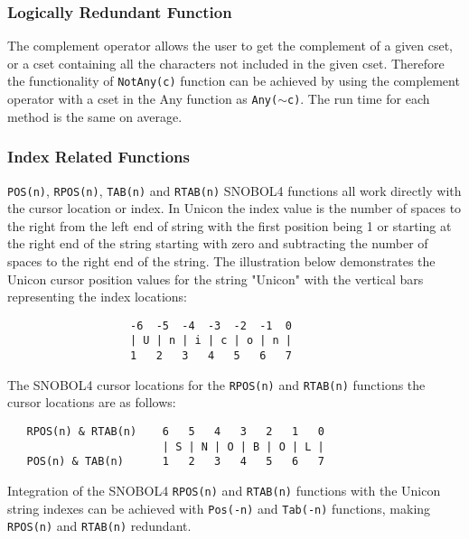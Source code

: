 \documentclass{article}
\begin{document}
\vspace{1 pc}
\subsubsection{Logically Redundant Function}
The complement operator allows the user to get the complement of a given cset, or a cset containing all the characters not included in the given cset.  Therefore the functionality of \texttt{NotAny(c)} function can be achieved by using the complement operator with a cset in the Any function as \texttt{Any($\sim$c)}.  The run time for each method is the same on average.

\vspace{1 pc}
\subsubsection{Index Related Functions}
\texttt{POS(n)}, \texttt{RPOS(n)}, \texttt{TAB(n)} and \texttt{RTAB(n)} SNOBOL4 functions all work directly with the cursor location or index.  In Unicon the index value is the number of spaces to the right from the left end of string with the first position being 1 or starting at the right end of the string starting with zero and subtracting the number of spaces to the right end of the string.\cite{JefferyUnicon}   The illustration below demonstrates the Unicon cursor position values for the string "Unicon" with the vertical bars representing the index locations:

\begin{verbatim}
                   -6  -5  -4  -3  -2  -1  0
                   | U | n | i | c | o | n |
                   1   2   3   4   5   6   7
\end{verbatim}

The SNOBOL4 cursor locations for the \texttt{RPOS(n)} and \texttt{RTAB(n)} functions the cursor locations are as follows:

\begin{verbatim}
   RPOS(n) & RTAB(n)    6   5   4   3   2   1   0
                        | S | N | O | B | O | L |
   POS(n) & TAB(n)      1   2   3   4   5   6   7
\end{verbatim}

Integration of the SNOBOL4 \texttt{RPOS(n)} and \texttt{RTAB(n)} functions with the Unicon string indexes can be achieved with \texttt{Pos(-n)} and \texttt{Tab(-n)} functions, making \texttt{RPOS(n)} and \texttt{RTAB(n)} redundant.

\vspace{1 pc}
\end{document}
